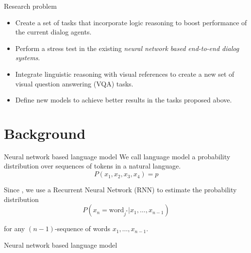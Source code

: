 \documentclass[10pt]{beamer}
\begin{document}
\maketitle


\begin{frame}{Research problem}
\begin{itemize}
\item Create a set of tasks that incorporate logic reasoning to boost performance of the current dialog agents.
\item Perform a stress test in the existing \textit{neural network based end-to-end dialog systems}.
\item Integrate linguistic reasoning with visual references to create a new set of visual question answering (VQA) tasks.
\item Define new models to achieve better results in the tasks proposed above. 
\end{itemize}
\end{frame}


\section{Background}

\begin{frame}{Neural network based language model}
We call \alert{language model} a probability distribution over sequences of tokens in a natural language.
\begin{equation}
P(x_1,x_2,x_3,x_4) = p
\end{equation}

Since \cite{Mikolov11}, we use a \alert{Recurrent Neural Network (RNN)} to estimate the probability distribution   \\

\begin{equation}
P(x_{n} = \text{word}_{j^{*}} | x_{1}, \dots ,x_{n-1})
\end{equation}

for any $(n-1)$-sequence of words $x_{1}, \dots ,x_{n-1}$.
\end{frame}

\begin{frame}{Neural network based language model}

\end{frame}
\end{document}
